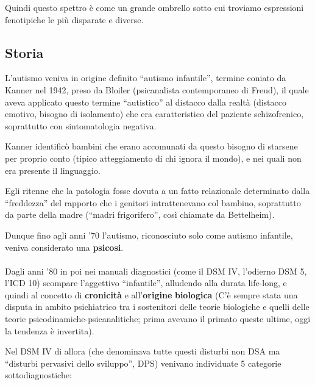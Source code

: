 Quindi questo spettro è come un grande ombrello sotto cui troviamo
espressioni fenotipiche le più disparate e diverse.

\subsection{Storia}

L'autismo veniva in origine definito ``autismo infantile'', termine
coniato da Kanner nel 1942, preso da Bloiler (psicanalista contemporaneo
di Freud), il quale aveva applicato questo termine ``autistico'' al
distacco dalla realtà (distacco emotivo, bisogno di isolamento) che era
caratteristico del paziente schizofrenico, soprattutto con
sintomatologia negativa.

Kanner identificò bambini che erano accomunati da questo bisogno di
starsene per proprio conto (tipico atteggiamento di chi ignora il
mondo), e nei quali non era presente il linguaggio.

Egli ritenne che la patologia fosse dovuta a un fatto relazionale
determinato dalla ``freddezza'' del rapporto che i genitori
intrattenevano col bambino, soprattutto da parte della madre (``madri
frigorifero'', così chiamate da Bettelheim).

Dunque fino agli anni '70 l'autismo, riconosciuto solo come autismo
infantile, veniva considerato una \textbf{psicosi}.
\\\\
Dagli anni '80 in poi nei manuali diagnostici (come il DSM IV, l'odierno
DSM 5, l'ICD 10) scompare l'aggettivo ``infantile'', alludendo alla
durata life-long, e quindi al concetto di \textbf{cronicità} e
all'\textbf{origine} \textbf{biologica} (C'è sempre stata una disputa in
ambito psichiatrico tra i sostenitori delle teorie biologiche e quelli
delle teorie psicodinamiche-psicanalitiche; prima avevano il primato
queste ultime, oggi la tendenza è invertita).

Nel DSM IV di allora (che denominava tutte questi disturbi non DSA ma
``disturbi pervasivi dello sviluppo'', DPS) venivano individuate 5
categorie sottodiagnostiche:

